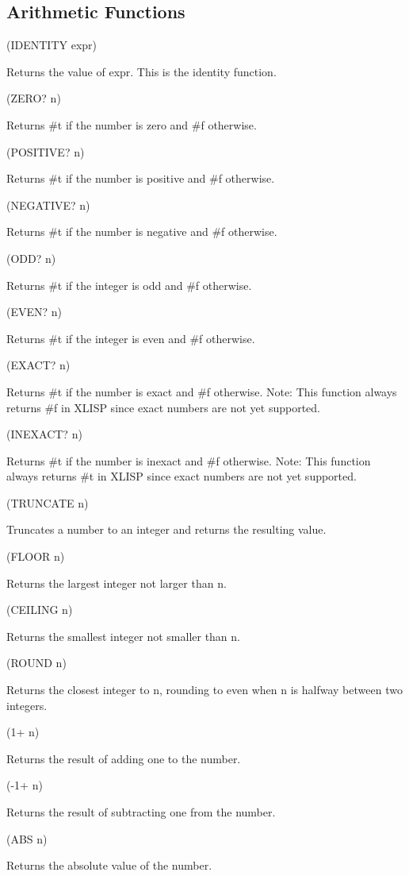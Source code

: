 \documentclass[11pt]{article}
\begin{document}
\subsection{Arithmetic Functions}
\label{sec-1-27}

(IDENTITY expr)

Returns the value of expr.  This is the identity function.

(ZERO? n)

Returns \#t if the number is zero and \#f otherwise.

(POSITIVE? n)

Returns \#t if the number is positive and \#f otherwise.

(NEGATIVE? n)

Returns \#t if the number is negative and \#f otherwise.

(ODD? n)

Returns \#t if the integer is odd and \#f otherwise.

(EVEN? n)

Returns \#t if the integer is even and \#f otherwise.

(EXACT? n)

Returns \#t if the number is exact and \#f otherwise. Note: This function
always returns \#f in XLISP since exact numbers are not yet supported.

(INEXACT? n)

Returns \#t if the number is inexact and \#f otherwise. Note: This
function always returns \#t in XLISP since exact numbers are not yet
supported.

(TRUNCATE n)

Truncates a number to an integer and returns the resulting value.

(FLOOR n)

Returns the largest integer not larger than n.

(CEILING n)

Returns the smallest integer not smaller than n.

(ROUND n)

Returns the closest integer to n, rounding to even when n is halfway
between two integers.

(1+ n)

Returns the result of adding one to the number.

(-1+ n)

Returns the result of subtracting one from the number.

(ABS n)

Returns the absolute value of the number.
\end{document}
